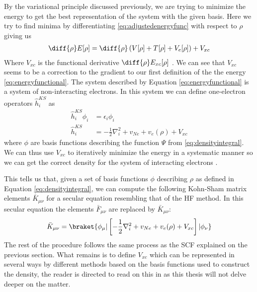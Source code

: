 \documentclass[../master_thesis.tex]{subfiles}
\begin{document}
By the variational principle discussed previously, we are trying to minimize the energy
to get the best representation of the system with the given basis. Here we try to
find minima by differentiating \ref{eq:adjustedenergyfunc} with respect to $\rho$ giving us
\begin{align}\label{eq:energyderiv}
   \diff{\rho}E[\rho] = \diff{\rho}\left( V[\rho] + T[\rho] + V_{e}[\rho]\right) + V_{xc}
\end{align}
Where $V_{xc}$ is the functional derivative $\diff{\rho}E_{xc}[\rho]$ \cite{Cramer:2004}.
We can see that $V_{xc}$ seems to be a correction to the gradient to our first definition
of the the energy \ref{eq:energyfunctional}. The system described by Equation
\ref{eq:energyfunctional} is a system of non-interacting electrons. In this
system we can define one-electron operators $\hat{h}_i^{KS}$ as
\begin{align}
  \hat{h}_i^{KS} \phi_i &= \epsilon_i \phi_i \\
  \hat{h}_i^{KS} &= - \frac{1}{2}\nabla^2_i + v_{Ne} + v_e(\rho) + V_{xc}
\end{align}
where $\phi$ are basis functions describing the function $\Psi$ from \ref{eq:densityintegral}.
We can thus use $V_{xc}$ to iteratively minimize the energy in a systematic manner so we can
get the correct density for the system of interacting electrons \cite{Cramer:2004}.

This tells us that, given a set of basis functions $\phi$ describing
$\rho$ as defined in Equation \ref{eq:densityintegral}, we can compute the following
Kohn-Sham  matrix elements $\bar{K}_{\mu\nu}$ for a secular equation resembling that of the \ac{HF}
method. In this secular equation the elements $\bar{F}_{\mu\nu}$ are replaced by $\bar{K}_{\mu\nu}$:
\begin{equation}
  \bar{K}_{\mu\nu} = \braket{\phi_\mu|\left[- \frac{1}{2}\nabla^2_i + v_{Ne} + v_e(\rho) + V_{xc}\right]|\phi_\nu}
\end{equation}
The rest of the procedure follows the same process as the \ac{SCF} explained on
the previous section.
What remains is to define $V_{xc}$ which can be represented in several ways by different methods
based on the basis functions used to construct the density, the reader is directed to
read on this in \cite{Cramer:2004} as this thesis will not delve deeper on the
matter.


\biblio
\end{document}

